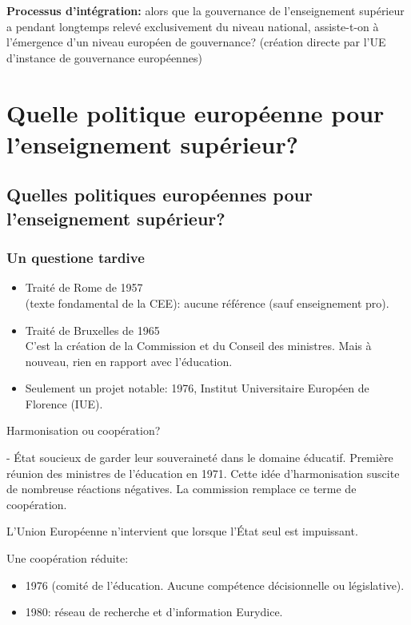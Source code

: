 \textbf{Processus d'intégration:} alors que la gouvernance de l'enseignement supérieur a pendant longtemps relevé exclusivement du niveau national, assiste-t-on à l'émergence d'un niveau européen de gouvernance? (création directe par l'UE d'instance de gouvernance européennes)

\section{Quelle politique européenne pour l'enseignement supérieur?}

\subsection{Quelles politiques européennes pour l'enseignement supérieur?}

	\subsubsection{Un questione tardive}

\begin{itemize}
\item Traité de Rome de 1957\\
(texte fondamental de la CEE): aucune référence (sauf enseignement pro).
\item Traité de Bruxelles de 1965\\ 
C'est la création de la Commission et du Conseil des ministres. Mais à nouveau, rien en rapport avec l'éducation.
\item Seulement un projet notable: 1976, Institut Universitaire Européen de Florence (IUE).  
\end{itemize}

Harmonisation ou coopération? 

- État soucieux de garder leur souveraineté dans le domaine éducatif.
Première réunion des ministres de l'éducation en 1971.
Cette idée d'harmonisation suscite de nombreuse réactions négatives. La commission remplace ce terme de coopération.

L'Union Européenne n'intervient que lorsque l'État seul est impuissant.

Une coopération réduite: 
\begin{itemize}
\item 1976 (comité de l'éducation. Aucune compétence décisionnelle ou législative).
\item 1980: réseau de recherche et d'information Eurydice.
\end{itemize}

